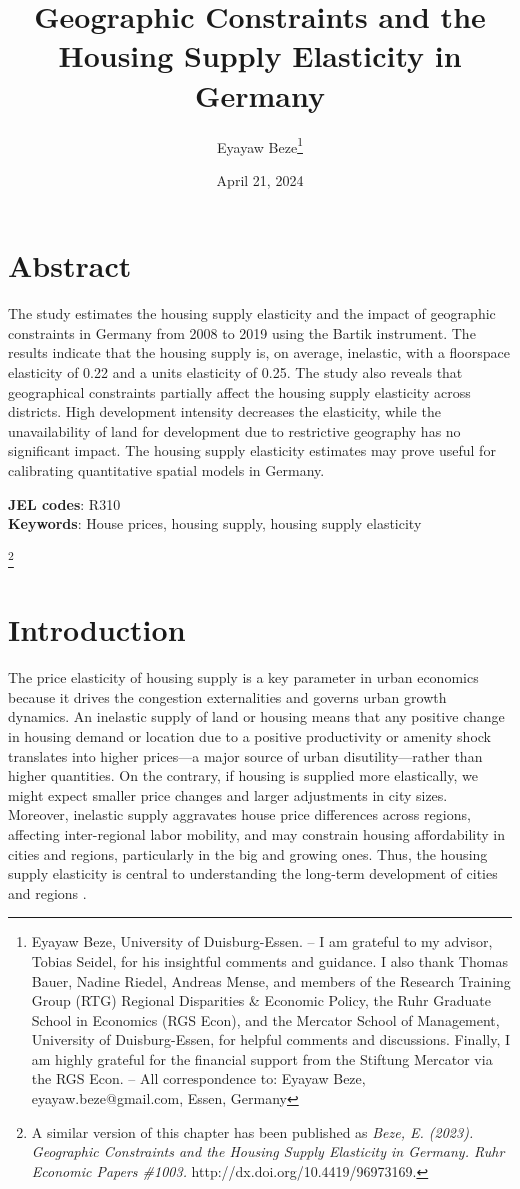 \documentclass[
  12pt,
]{article}
\title{Geographic Constraints and the Housing Supply Elasticity in
Germany}
\author{Eyayaw Beze\footnote{Eyayaw Beze, University of Duisburg-Essen.
  -- I am grateful to my advisor, Tobias Seidel, for his insightful
  comments and guidance. I also thank Thomas Bauer, Nadine Riedel,
  Andreas Mense, and members of the Research Training Group (RTG)
  Regional Disparities \& Economic Policy, the Ruhr Graduate School in
  Economics (RGS Econ), and the Mercator School of Management,
  University of Duisburg-Essen, for helpful comments and discussions.
  Finally, I am highly grateful for the financial support from the
  Stiftung Mercator via the RGS Econ. -- All correspondence to: Eyayaw
  Beze, eyayaw.beze@gmail.com, Essen, Germany}}
\date{April 21, 2024}
\newcommand\blfootnote[1]{%
  \begingroup
  \renewcommand\thefootnote{}\footnote{#1}%
  \addtocounter{footnote}{-1}%
  \endgroup
}
\begin{document}
\maketitle


\section*{Abstract}\label{abstract}

The study estimates the housing supply elasticity and the impact of
geographic constraints in Germany from 2008 to 2019 using the Bartik
instrument. The results indicate that the housing supply is, on average,
inelastic, with a floorspace elasticity of 0.22 and a units elasticity
of 0.25. The study also reveals that geographical constraints partially
affect the housing supply elasticity across districts. High development
intensity decreases the elasticity, while the unavailability of land for
development due to restrictive geography has no significant impact. The
housing supply elasticity estimates may prove useful for calibrating
quantitative spatial models in Germany.

\textbf{JEL codes}: R310\\
\textbf{Keywords}: House prices, housing supply, housing supply
elasticity

\blfootnote{A similar version of this chapter has been published as \textit{Beze, E. (2023). Geographic Constraints and the Housing Supply Elasticity in Germany. Ruhr Economic Papers \#1003.} http://dx.doi.org/10.4419/96973169.}


\newpage

\section{Introduction}\label{introduction}


The price elasticity of housing supply is a key parameter in urban
economics because it drives the congestion externalities and governs
urban growth dynamics. An inelastic supply of land or housing means that
any positive change in housing demand or location due to a positive
productivity or amenity shock translates into higher prices---a major
source of urban disutility---rather than higher quantities. On the
contrary, if housing is supplied more elastically, we might expect
smaller price changes and larger adjustments in city sizes. Moreover,
inelastic supply aggravates house price differences across regions,
affecting inter-regional labor mobility, and may constrain housing
affordability in cities and regions, particularly in the big and growing
ones. Thus, the housing supply elasticity is central to understanding
the long-term development of cities and regions
\citep{combes_etal_2019, glaeser_etal_2006, saks_2008, lerbs_2014}.
\end{document}
